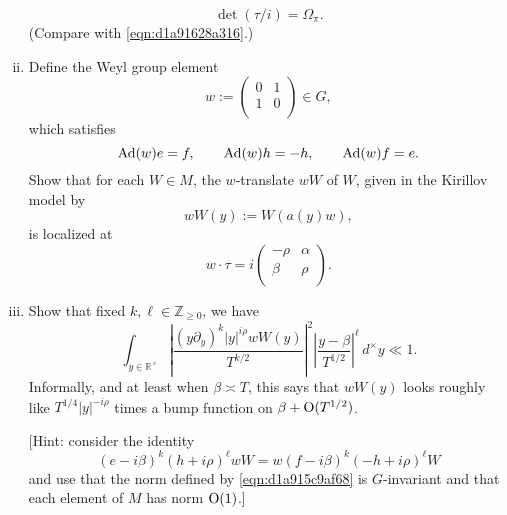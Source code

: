 \documentclass[reqno]{amsart} 
\numberwithin{equation}{section}
\begin{document}
\begin{exercise}
\begin{enumerate}[(i)]
\begin{equation*}
      \det (\tau/i) = \Omega_\pi.
    \end{equation*}
    (Compare with \eqref{eqn:d1a91628a316}.)
  \item Define the Weyl group element
    \begin{equation*}
      w :=
      \begin{pmatrix}
        0 & 1 \\
        1 & 0 \\
      \end{pmatrix}
      \in G,
    \end{equation*}
    which satisfies
    \begin{equation*}
      \operatorname{Ad}(w) e = f, \qquad
      \operatorname{Ad}(w) h = -h,
      \qquad
      \operatorname{Ad}(w) f = e.
    \end{equation*}
    Show that for each $W \in M$, the $w$-translate $w W$ of $W$, given in the Kirillov model by
    \begin{equation}\label{eqn:d1aa0102b8bb}
      w W(y) := W(a(y) w),
    \end{equation}
    is localized at
    \begin{equation*}
      w \cdot \tau = i
      \begin{pmatrix}
        -\rho  & \alpha  \\
        \beta  & \rho \\
      \end{pmatrix}.
    \end{equation*}
  \item Show that fixed $k, \ell \in \mathbb{Z}_{\geq 0}$, we have
    \begin{equation*}
      \int_{y \in \mathbb{R}^\times }
      \left\lvert \frac{(y \partial_y)^k |y|^{i \rho} w W (y)}{T^{k/2}}  \right\rvert^2
      \left\lvert \frac{y - \beta }{ T^{1/2} } \right\rvert^{\ell} \,d^\times y \ll 1.
    \end{equation*}
    Informally, and at least when $\beta \asymp T$, this says that $w W(y)$ looks roughly like $T^{1/4} |y|^{-i \rho}$ times a bump function on $\beta + \operatorname{O}(T^{1/2})$.

    [Hint: consider the identity
    \begin{equation*}
      (e - i \beta)^k (h + i \rho)^\ell w W
      =
      w (f - i \beta)^k (-h + i \rho)^\ell W
    \end{equation*}
    and use that the norm defined by \eqref{eqn:d1a915c9af68} is $G$-invariant and that each element of $M$ has norm $\operatorname{O}(1)$.]
  \end{enumerate}
\end{exercise}
\end{document}
